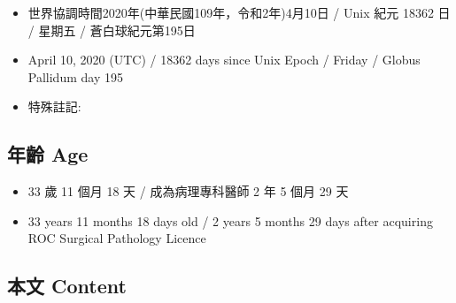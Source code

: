\documentclass[a5paper, 12pt
]{book}
\providecommand{\tightlist}{%
  \setlength{\itemsep}{0pt}\setlength{\parskip}{0pt}}
\begin{document}
\begin{itemize}
\tightlist
\item
  世界協調時間2020年(中華民國109年，令和2年)4月10日 / Unix 紀元 18362 日
  / 星期五 / 蒼白球紀元第195日
\item
  April 10, 2020 (UTC) / 18362 days since Unix Epoch / Friday / Globus
  Pallidum day 195
\item
  特殊註記:
\end{itemize}

\hypertarget{ux5e74ux9f61-age-40}{%
\subsection{年齡 Age}\label{ux5e74ux9f61-age-40}}

\begin{itemize}
\tightlist
\item
  33 歲 11 個月 18 天 / 成為病理專科醫師 2 年 5 個月 29 天
\item
  33 years 11 months 18 days old / 2 years 5 months 29 days after
  acquiring ROC Surgical Pathology Licence
\end{itemize}

\hypertarget{ux672cux6587-content-40}{%
\subsection{本文 Content}\label{ux672cux6587-content-40}}
\end{document}
